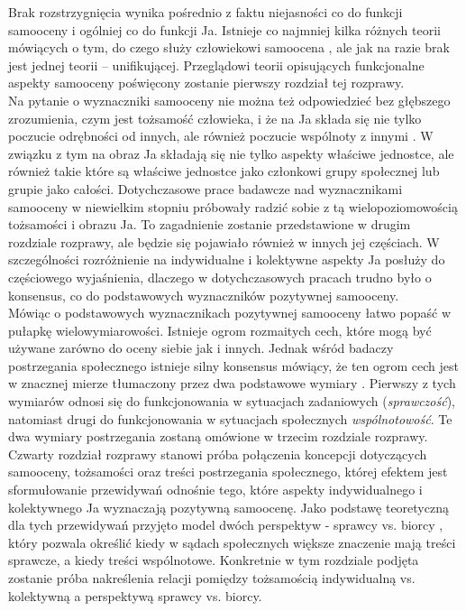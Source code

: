 \documentclass[man]{apa6}
\begin{document}
Brak rozstrzygnięcia wynika pośrednio z faktu niejasności co do funkcji samooceny i ogólniej co do funkcji Ja. Istnieje co najmniej kilka różnych teorii mówiących o tym, do czego służy człowiekowi samoocena \parencite[np., ][]{leary1995self, pyszczynski2004people}, ale jak na razie brak jest jednej teorii -- unifikującej. Przeglądowi teorii opisujących funkcjonalne aspekty samooceny poświęcony zostanie pierwszy rozdział tej rozprawy.\\

Na pytanie o wyznaczniki samooceny nie można też odpowiedzieć bez głębszego zrozumienia, czym jest tożsamość człowieka, i że na Ja składa się nie tylko poczucie odrębności od innych, ale również poczucie wspólnoty z innymi \parencite[np.,][]{brewer1996we}. W związku z tym na obraz Ja składają się nie tylko aspekty właściwe jednostce, ale również takie które są właściwe jednostce jako członkowi grupy społecznej lub grupie jako całości. Dotychczasowe prace badawcze nad wyznacznikami samooceny w niewielkim stopniu próbowały radzić sobie z tą wielopoziomowością tożsamości i obrazu Ja. To zagadnienie zostanie przedstawione w drugim rozdziale rozprawy, ale będzie się pojawiało również w innych jej częściach. W szczególności rozróżnienie na indywidualne i kolektywne aspekty Ja posłuży do częściowego wyjaśnienia, dlaczego w dotychczasowych pracach trudno było o konsensus, co do podstawowych wyznaczników pozytywnej samooceny.\\

Mówiąc o podstawowych wyznacznikach pozytywnej samooceny łatwo popaść w pułapkę wielowymiarowości. Istnieje ogrom rozmaitych cech, które mogą być używane zarówno do oceny siebie jak i innych. Jednak wśród badaczy postrzegania społecznego istnieje silny konsensus mówiący, że ten ogrom cech jest w znacznej mierze tłumaczony przez dwa podstawowe wymiary \parencite{judd2005fundamental, fiske2007universal}. Pierwszy z tych wymiarów odnosi się do funkcjonowania w sytuacjach zadaniowych (\emph{sprawczość}), natomiast drugi do funkcjonowania w sytuacjach społecznych \emph{wspólnotowość}. Te dwa wymiary postrzegania zostaną omówione w trzecim rozdziale rozprawy.\\

Czwarty rozdział rozprawy stanowi próba połączenia koncepcji dotyczących samooceny, tożsamości oraz treści postrzegania społecznego, której efektem jest sformułowanie przewidywań odnośnie tego, które aspekty indywidualnego i kolektywnego Ja wyznaczają pozytywną samoocenę. Jako podstawę teoretyczną dla tych przewidywań przyjęto model dwóch perspektyw - sprawcy vs. biorcy \parencite{abele2014communal}, który pozwala określić kiedy w sądach społecznych większe znaczenie mają treści sprawcze, a kiedy treści wspólnotowe. Konkretnie w tym rozdziale podjęta zostanie próba nakreślenia relacji pomiędzy tożsamością indywidualną vs. kolektywną a perspektywą sprawcy vs. biorcy.\\
\end{document}
